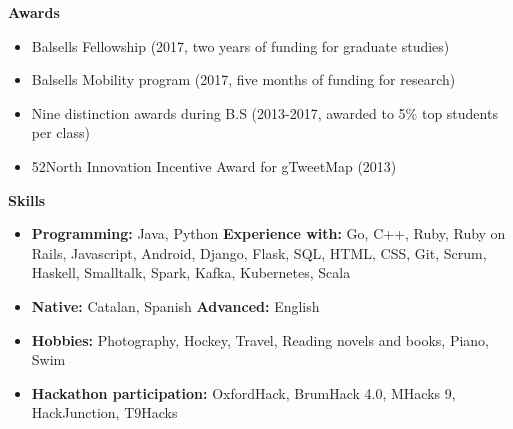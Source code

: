 \documentclass[letterpaper,10pt]{article}
\newcommand{\resheading}[1]{{\large \colorbox{mygrey}{\begin{minipage}{\textwidth}{\textbf{#1 \vphantom{p\^{E}}}}\end{minipage}}}}
\begin{document}
\resheading{Awards}
\begin{itemize}
    \item Balsells Fellowship (2017, two years of funding for graduate studies)
    \item Balsells Mobility program (2017, five months of funding for research)
    \item Nine distinction awards during B.S (2013-2017, awarded to 5\% top students per class)
    \item 52North Innovation Incentive Award for gTweetMap (2013)
\end{itemize}

\resheading{Skills}
\begin{itemize}
	\item \textbf{Programming:} Java, Python \textbf{Experience with:}  Go, C++, Ruby, Ruby on Rails, Javascript, Android, Django, Flask, SQL, HTML, CSS, Git, Scrum, Haskell, Smalltalk, Spark, Kafka, Kubernetes, Scala
	\item \textbf{Native:} Catalan, Spanish \textbf{Advanced:} English
	\item \textbf{Hobbies:} Photography, Hockey, Travel, Reading novels and books, Piano, Swim 
	\item \textbf{Hackathon participation:} OxfordHack, BrumHack 4.0, MHacks 9, HackJunction, T9Hacks  

\end{itemize}
\end{document}
